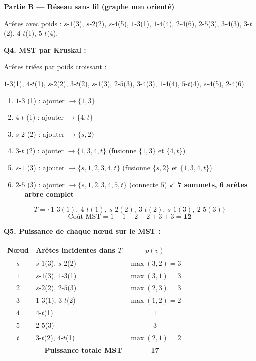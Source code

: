 \documentclass[12pt,a4paper]{article}
\begin{document}
\begin{correction}
\bigskip
\textbf{Partie B --- R\'eseau sans fil (graphe non orient\'e)}

\medskip
Ar\^etes avec poids : $s$-$1$(3), $s$-$2$(2), $s$-$4$(5), $1$-$3$(1), $1$-$4$(4), $2$-$4$(6), $2$-$5$(3), $3$-$4$(3), $3$-$t$(2), $4$-$t$(1), $5$-$t$(4).

\medskip
\textbf{Q4. MST par Kruskal :}

Ar\^etes tri\'ees par poids croissant :

$1$-$3$(1), $4$-$t$(1), $s$-$2$(2), $3$-$t$(2), $s$-$1$(3), $2$-$5$(3), $3$-$4$(3), $1$-$4$(4), $5$-$t$(4), $s$-$4$(5), $2$-$4$(6)

\begin{enumerate}[nosep]
    \item $1$-$3$ (1) : ajouter $\to \{1,3\}$
    \item $4$-$t$ (1) : ajouter $\to \{4,t\}$
    \item $s$-$2$ (2) : ajouter $\to \{s,2\}$
    \item $3$-$t$ (2) : ajouter $\to \{1,3,4,t\}$ (fusionne $\{1,3\}$ et $\{4,t\}$)
    \item $s$-$1$ (3) : ajouter $\to \{s,1,2,3,4,t\}$ (fusionne $\{s,2\}$ et $\{1,3,4,t\}$)
    \item $2$-$5$ (3) : ajouter $\to \{s,1,2,3,4,5,t\}$ (connecte $5$) $\checkmark$ \textbf{7 sommets, 6 ar\^etes = arbre complet}
\end{enumerate}

$$T = \{1\text{-}3(1),\ 4\text{-}t(1),\ s\text{-}2(2),\ 3\text{-}t(2),\ s\text{-}1(3),\ 2\text{-}5(3)\}$$
$$\text{Co\^ut MST} = 1+1+2+2+3+3 = \mathbf{12}$$

\medskip
\textbf{Q5. Puissance de chaque n\oe ud sur le MST :}

\begin{center}
\renewcommand{\arraystretch}{1.2}
\begin{tabular}{|c|l|c|}
\hline
\textbf{N\oe ud} & \textbf{Ar\^etes incidentes dans $T$} & $p(v)$ \\\hline
$s$ & $s$-$1$(3), $s$-$2$(2) & $\max(3,2) = 3$ \\\hline
$1$ & $s$-$1$(3), $1$-$3$(1) & $\max(3,1) = 3$ \\\hline
$2$ & $s$-$2$(2), $2$-$5$(3) & $\max(2,3) = 3$ \\\hline
$3$ & $1$-$3$(1), $3$-$t$(2) & $\max(1,2) = 2$ \\\hline
$4$ & $4$-$t$(1) & $1$ \\\hline
$5$ & $2$-$5$(3) & $3$ \\\hline
$t$ & $3$-$t$(2), $4$-$t$(1) & $\max(2,1) = 2$ \\\hline\hline
\multicolumn{2}{|r|}{\textbf{Puissance totale MST}} & $\mathbf{17}$ \\\hline
\end{tabular}
\end{center}


\end{correction}
\end{document}
